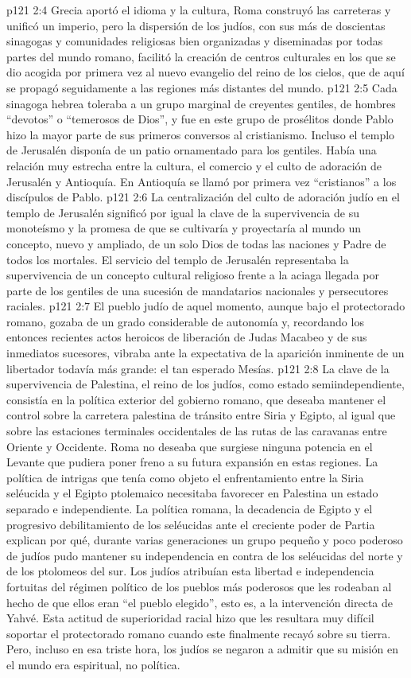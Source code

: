 \vs p121 2:4 Grecia aportó el idioma y la cultura, Roma construyó las carreteras y unificó un imperio, pero la dispersión de los judíos, con sus más de doscientas sinagogas y comunidades religiosas bien organizadas y diseminadas por todas partes del mundo romano, facilitó la creación de centros culturales en los que se dio acogida por primera vez al nuevo evangelio del reino de los cielos, que de aquí se propagó seguidamente a las regiones más distantes del mundo.
\vs p121 2:5 Cada sinagoga hebrea toleraba a un grupo marginal de creyentes gentiles, de hombres “devotos” o “temerosos de Dios”, y fue en este grupo de prosélitos donde Pablo hizo la mayor parte de sus primeros conversos al cristianismo. Incluso el templo de Jerusalén disponía de un patio ornamentado para los gentiles. Había una relación muy estrecha entre la cultura, el comercio y el culto de adoración de Jerusalén y Antioquía. En Antioquía se llamó por primera vez “cristianos” a los discípulos de Pablo.
\vs p121 2:6 La centralización del culto de adoración judío en el templo de Jerusalén significó por igual la clave de la supervivencia de su monoteísmo y la promesa de que se cultivaría y proyectaría al mundo un concepto, nuevo y ampliado, de un solo Dios de todas las naciones y Padre de todos los mortales. El servicio del templo de Jerusalén representaba la supervivencia de un concepto cultural religioso frente a la aciaga llegada por parte de los gentiles de una sucesión de mandatarios nacionales y persecutores raciales.
\vs p121 2:7 \pc El pueblo judío de aquel momento, aunque bajo el protectorado romano, gozaba de un grado considerable de autonomía y, recordando los entonces recientes actos heroicos de liberación de Judas Macabeo y de sus inmediatos sucesores, vibraba ante la expectativa de la aparición inminente de un libertador todavía más grande: el tan esperado Mesías.
\vs p121 2:8 La clave de la supervivencia de Palestina, el reino de los judíos, como estado semiindependiente, consistía en la política exterior del gobierno romano, que deseaba mantener el control sobre la carretera palestina de tránsito entre Siria y Egipto, al igual que sobre las estaciones terminales occidentales de las rutas de las caravanas entre Oriente y Occidente. Roma no deseaba que surgiese ninguna potencia en el Levante que pudiera poner freno a su futura expansión en estas regiones. La política de intrigas que tenía como objeto el enfrentamiento entre la Siria seléucida y el Egipto ptolemaico necesitaba favorecer en Palestina un estado separado e independiente. La política romana, la decadencia de Egipto y el progresivo debilitamiento de los seléucidas ante el creciente poder de Partia explican por qué, durante varias generaciones un grupo pequeño y poco poderoso de judíos pudo mantener su independencia en contra de los seléucidas del norte y de los ptolomeos del sur. Los judíos atribuían esta libertad e independencia fortuitas del régimen político de los pueblos más poderosos que les rodeaban al hecho de que ellos eran “el pueblo elegido”, esto es, a la intervención directa de Yahvé. Esta actitud de superioridad racial hizo que les resultara muy difícil soportar el protectorado romano cuando este finalmente recayó sobre su tierra. Pero, incluso en esa triste hora, los judíos se negaron a admitir que su misión en el mundo era espiritual, no política.
